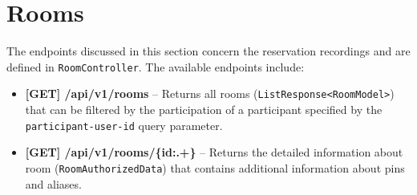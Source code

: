 \section{Rooms}
The endpoints discussed in this section concern the reservation recordings and are defined in \texttt{RoomController}.
The available endpoints include:
\begin{itemize}
    \item \textbf{[GET] /api/v1/rooms} -- Returns all rooms (\texttt{ListResponse<Room\-Model>}) that can be filtered by the participation of a participant specified by the \texttt{participant-user-id} query parameter.
    \item \textbf{[GET] /api/v1/rooms/\{id:.+\}} -- Returns the detailed information about room (\texttt{RoomAuthorizedData}) that contains additional information about pins and aliases.
\end{itemize}
